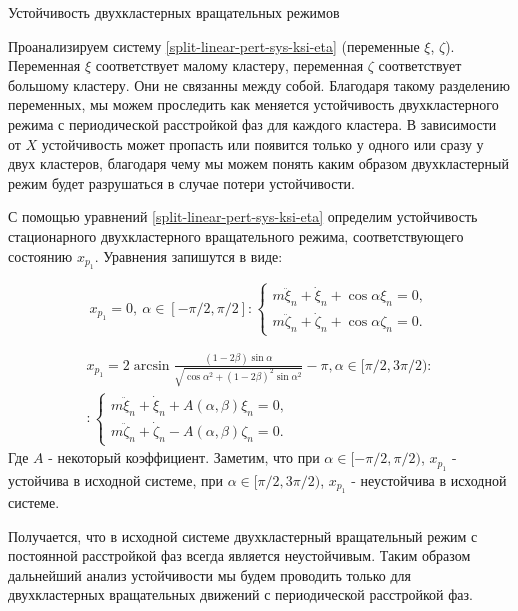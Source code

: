 \begin{chapter}{Устойчивость двухкластерных вращательных режимов}
	
	Проанализируем систему \ref{split-linear-pert-sys-ksi-eta} (переменные $\xi$, $\zeta$).
	Переменная $\xi$ соответствует малому кластеру, переменная $\zeta$ соответствует большому кластеру. 
	Они не связанны между собой.
	Благодаря такому разделению переменных, мы можем проследить как меняется устойчивость
	двухкластерного режима с периодической расстройкой фаз для каждого кластера. В зависимости от $X$ устойчивость
	может пропасть или появится только у одного или сразу у двух кластеров, благодаря чему мы можем
	понять каким образом двухкластерный режим будет разрушаться в случае потери устойчивости.
	
	С помощью уравнений \ref{split-linear-pert-sys-ksi-eta} определим устойчивость стационарного
	двухкластерного вращательного режима, соответствующего состоянию $x_{p_1}$.
	Уравнения запишутся в виде:
	
	\begin{equation}
		x_{p_1} = 0, \ \alpha \in [-\pi/ 2, \pi/2]: 
		\begin{cases}
			m\ddot{\xi}_n + \dot{\xi}_n + \cos{\alpha}\xi_n = 0, \\
			m\ddot{\zeta}_n + \dot{\zeta}_n + \cos{\alpha}\zeta_n = 0.
		\end{cases}
	\end{equation}
	
	\begin{equation}
		\begin{split}
			x_{p_1} = 2\arcsin{\frac{(1 - 2\beta) \sin{\alpha}}{\sqrt{\cos{\alpha}^2 + (1 - 2\beta)^2\sin{\alpha}^2}}} - \pi , \alpha \in [\pi/2, 3\pi/2): \\ 
			:\begin{cases}
				m\ddot{\xi}_n + \dot{\xi}_n + A(\alpha, \beta) \xi_n = 0, \\
				m\ddot{\zeta}_n + \dot{\zeta}_n -A(\alpha, \beta) \zeta_n = 0.
			\end{cases}
		\end{split}
	\end{equation}
	Где $A$ - некоторый коэффициент. Заметим, что при $\alpha \in [-\pi/ 2, \pi/2)$, $x_{p_1}$ - устойчива в исходной системе,
	при $\alpha \in [\pi/2, 3\pi/2)$, $x_{p_1}$ - неустойчива в исходной системе.

	Получается, что в исходной системе двухкластерный вращательный режим с постоянной расстройкой фаз всегда является неустойчивым.
	Таким образом дальнейший анализ устойчивости мы будем проводить только для двухкластерных вращательных движений с периодической
	расстройкой фаз.



\end{chapter}
